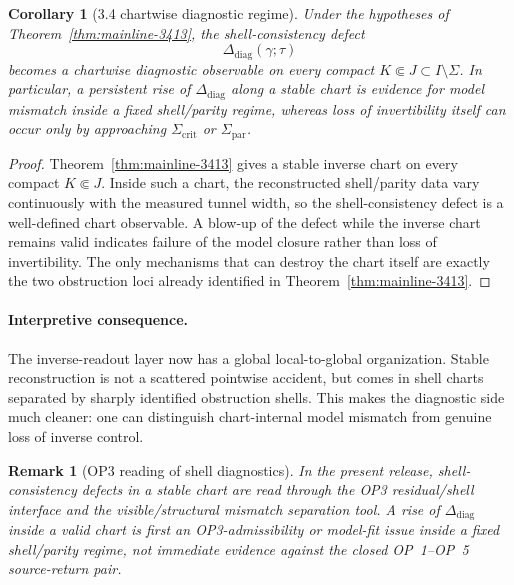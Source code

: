 \documentclass[12pt,a4paper]{article}
\newtheorem{corollary}[theorem]{Corollary}
\newtheorem{remark}[theorem]{Remark}
\begin{document}
\begin{corollary}[3.4 chartwise diagnostic regime]
\label{cor:mainline-3413-chartwise}
Under the hypotheses of Theorem~\ref{thm:mainline-3413}, the shell-consistency defect
\[
 \Delta_{\mathrm{diag}}(\gamma;\tau)
\]
becomes a chartwise diagnostic observable on every compact $K\Subset J\subset I\setminus\Sigma$. In particular, a persistent rise of $\Delta_{\mathrm{diag}}$ along a stable chart is evidence for model mismatch inside a fixed shell/parity regime, whereas loss of invertibility itself can occur only by approaching $\Sigma_{\mathrm{crit}}$ or $\Sigma_{\mathrm{par}}$.
\end{corollary}

\begin{proof}
Theorem~\ref{thm:mainline-3413} gives a stable inverse chart on every compact $K\Subset J$. Inside such a chart, the reconstructed shell/parity data vary continuously with the measured tunnel width, so the shell-consistency defect is a well-defined chart observable. A blow-up of the defect while the inverse chart remains valid indicates failure of the model closure rather than loss of invertibility. The only mechanisms that can destroy the chart itself are exactly the two obstruction loci already identified in Theorem~\ref{thm:mainline-3413}.
\end{proof}

\paragraph{Interpretive consequence.}
The inverse-readout layer now has a global local-to-global organization. Stable reconstruction is not a scattered pointwise accident, but comes in shell charts separated by sharply identified obstruction shells. This makes the diagnostic side much cleaner: one can distinguish chart-internal model mismatch from genuine loss of inverse control.

\begin{remark}[OP3 reading of shell diagnostics]
In the present release, shell-consistency defects in a stable chart are read through the OP3 residual/shell interface and the visible/structural mismatch separation tool. A rise of $\Delta_{\mathrm{diag}}$ inside a valid chart is first an OP3-admissibility or model-fit issue inside a fixed shell/parity regime, not immediate evidence against the closed OP~1--OP~5 source-return pair.
\end{remark}
\end{document}
